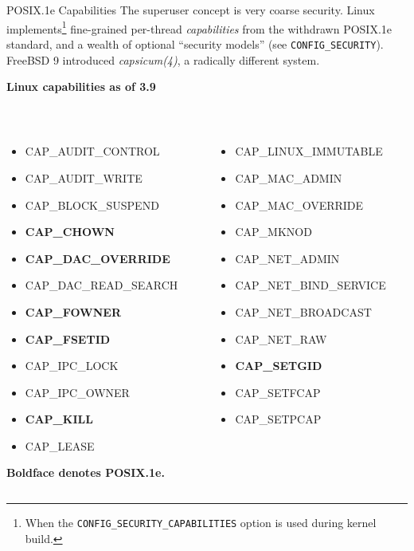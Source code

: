 \documentclass[mathserif,xcolor={dvipsnames,table}]{beamer}
\begin{document}
\begin{frame}{POSIX.1e Capabilities}
\footnotesize{The superuser concept is very coarse security. Linux
implements\footnote{\tiny{When the {\tt CONFIG\_SECURITY\_CAPABILITIES} option is used during kernel build.}}
fine-grained per-thread \textit{capabilities} from the withdrawn POSIX.1e standard, and a
wealth of optional ``security models'' (see {\tt CONFIG\_SECURITY}). FreeBSD 9
introduced \textit{capsicum(4)}, a radically different system.}
\begin{center}\footnotesize{\textbf{Linux capabilities as of 3.9}}\end{center}
\tiny{
\begin{columns}
\begin{column}{.33\textwidth}
{\tt
\begin{itemize}
\item CAP\_AUDIT\_CONTROL
\item CAP\_AUDIT\_WRITE
\item CAP\_BLOCK\_SUSPEND
\item \textbf{CAP\_CHOWN}
\item \textbf{CAP\_DAC\_OVERRIDE}
\item CAP\_DAC\_READ\_SEARCH
\item \textbf{CAP\_FOWNER}
\item \textbf{CAP\_FSETID}
\item CAP\_IPC\_LOCK
\item CAP\_IPC\_OWNER
\item \textbf{CAP\_KILL}
\item CAP\_LEASE
\end{itemize}
}
\hfill \textbf{Boldface denotes POSIX.1e.}
\end{column}
\begin{column}{.33\textwidth}
{\tt
\begin{itemize}
\item CAP\_LINUX\_IMMUTABLE
\item CAP\_MAC\_ADMIN
\item CAP\_MAC\_OVERRIDE
\item CAP\_MKNOD
\item CAP\_NET\_ADMIN
\item CAP\_NET\_BIND\_SERVICE
\item CAP\_NET\_BROADCAST
\item CAP\_NET\_RAW
\item \textbf{CAP\_SETGID}
\item CAP\_SETFCAP
\item CAP\_SETPCAP

\end{itemize}}
\end{column}
\end{columns}}
\end{frame}
\end{document}
